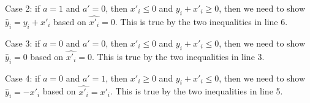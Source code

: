 Case 2: if $a = 1$ and $a' = 0$, then $x'_i \leq 0 $ and $y_i+x'_i\geq 0$, then we need to show $\hat{y}_i = y_i+x'_i$ based on  $\hat{x'_i} = 0$. This is true by the two inequalities in line 6.

Case 3: if $a = 0$ and $a' = 0$, then $x'_i \leq 0 $ and $y_i+x'_i\leq 0$, then we need to show $\hat{y}_i = 0$ based on  $\hat{x'_i} = 0$. This is true by the two inequalities in line 3.


Case 4: if $a = 0$ and $a' = 1$, then $x'_i \geq 0 $ and $y_i+x'_i\leq 0$, then we need to show $\hat{y}_i = -x'_i$ based on  $\hat{x'_i} = x'_i$. This is true by the two inequalities in line 5.


	
	
	

	
    
    
    

